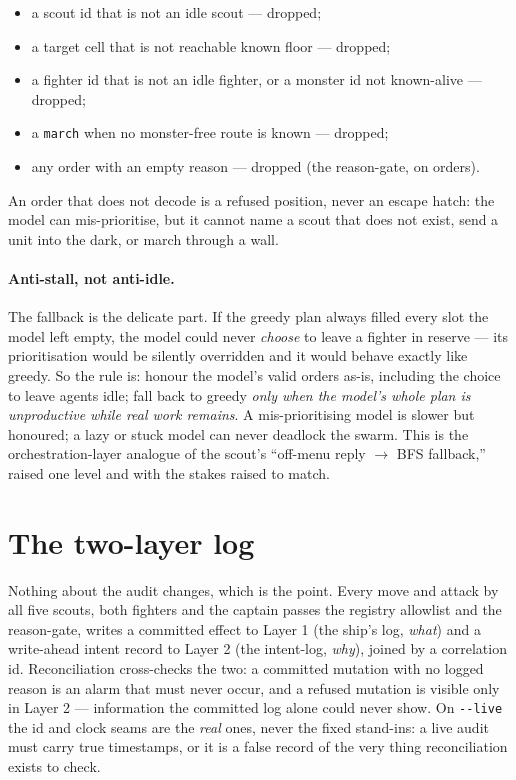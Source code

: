 \documentclass[11pt]{article}
\newcommand{\code}[1]{\texttt{#1}}
\begin{document}
\begin{itemize}[leftmargin=1.4em,itemsep=2pt]
  \item a scout id that is not an idle scout --- dropped;
  \item a target cell that is not reachable known floor --- dropped;
  \item a fighter id that is not an idle fighter, or a monster id not known-alive ---
    dropped;
  \item a \code{march} when no monster-free route is known --- dropped;
  \item any order with an empty reason --- dropped (the reason-gate, on orders).
\end{itemize}

An order that does not decode is a refused position, never an escape hatch: the model
can mis-prioritise, but it cannot name a scout that does not exist, send a unit into the
dark, or march through a wall.

\paragraph{Anti-stall, not anti-idle.} The fallback is the delicate part. If the greedy
plan always filled every slot the model left empty, the model could never \emph{choose}
to leave a fighter in reserve --- its prioritisation would be silently overridden and it
would behave exactly like greedy. So the rule is: honour the model's valid orders
as-is, including the choice to leave agents idle; fall back to greedy \emph{only when
the model's whole plan is unproductive while real work remains}. A mis-prioritising
model is slower but honoured; a lazy or stuck model can never deadlock the swarm. This
is the orchestration-layer analogue of the scout's ``off-menu reply $\to$ BFS
fallback,'' raised one level and with the stakes raised to match.

\section{The two-layer log}

Nothing about the audit changes, which is the point. Every move and attack by all five
scouts, both fighters and the captain passes the registry allowlist and the reason-gate,
writes a committed effect to Layer 1 (the ship's log, \emph{what}) and a write-ahead
intent record to Layer 2 (the intent-log, \emph{why}), joined by a correlation id.
Reconciliation cross-checks the two: a committed mutation with no logged reason is an
alarm that must never occur, and a refused mutation is visible only in Layer 2 ---
information the committed log alone could never show. On \code{-{}-live} the id and clock
seams are the \emph{real} ones, never the fixed stand-ins: a live audit must carry true
timestamps, or it is a false record of the very thing reconciliation exists to check.
\end{document}
